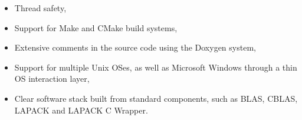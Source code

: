 \begin{itemize}
    \item Thread safety,
    \item Support for Make and CMake build systems,
    \item Extensive comments in the source code using the Doxygen system,
    \item Support for multiple Unix OSes, as well as Microsoft Windows through a thin
          OS interaction layer,
    \item Clear software stack built from standard components, such as BLAS, CBLAS,
          LAPACK and LAPACK C Wrapper.
\end{itemize}

